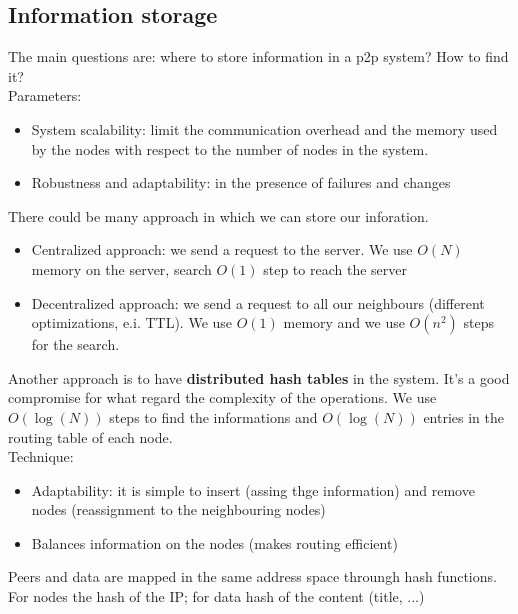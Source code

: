 \documentclass[paper=a4, fontsize=11pt]{scrartcl} %
\numberwithin{equation}{section} %
\numberwithin{figure}{section} %
\numberwithin{table}{section} %
\begin{document}
\subsection*{Information storage}
The main questions are: where to store information in a p2p system? How to find it?\\
Parameters: 
\begin{itemize}
\item System scalability: limit the communication overhead and the memory used by the nodes with respect to the number of nodes in the system.
\item Robustness and adaptability: in the presence of failures and changes
\end{itemize}
There could be many approach in which we can store our inforation.
\begin{itemize}
\item Centralized approach: we send a request to the server. We use $O(N)$ memory on the server, search $O(1)$ step to reach the server
\item Decentralized approach: we send a request to all our neighbours (different optimizations, e.i. TTL). We use $O(1)$ memory and we use $O(n^2)$ steps for the search.
\end{itemize}
Another approach is to have \textbf{distributed hash tables} in the system. It's a good compromise for what regard the complexity of the operations. We use $O(\log(N))$ steps to find the informations and $O(\log(N))$ entries in the routing table of each node.\\
Technique: 
\begin{itemize}
\item Adaptability: it is simple to insert (assing thge information) and remove nodes (reassignment to the neighbouring nodes)
\item Balances information on the nodes (makes routing efficient)
\end{itemize}
Peers and data are mapped in the same address space throungh hash functions. For nodes the hash of the IP; for data hash of the content (title, ...)\\
\end{document}

